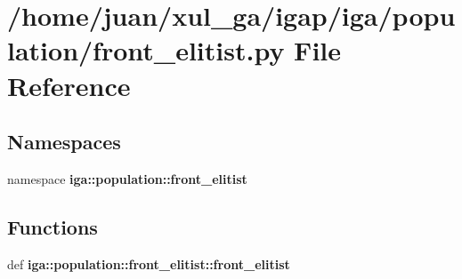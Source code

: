 \section{/home/juan/xul\_\-ga/igap/iga/population/front\_\-elitist.py File Reference}
\label{front__elitist_8py}
\subsection*{Namespaces}
\begin{CompactItemize}
\item 
namespace {\bf iga::population::front\_\-elitist}
\end{CompactItemize}
\subsection*{Functions}
\begin{CompactItemize}
\item 
def {\bf iga::population::front\_\-elitist::front\_\-elitist}
\end{CompactItemize}
